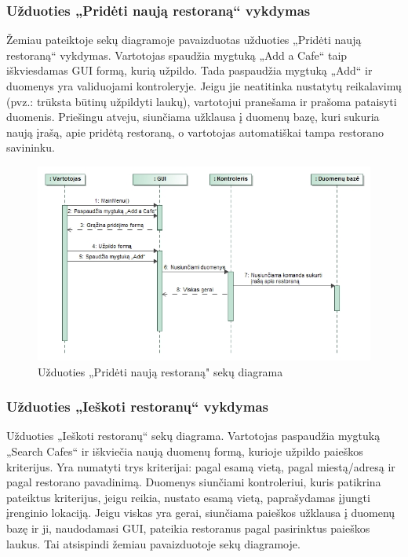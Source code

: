 \documentclass{VUMIFPSkursinis}
\begin{document}
{{{{{%
\subsubsection{Užduoties „Pridėti naują restoraną“ vykdymas}
Žemiau pateiktoje sekų diagramoje pavaizduotas užduoties „Pridėti naują restoraną“ vykdymas. Vartotojas spaudžia mygtuką „Add a Cafe“ taip iškviesdamas GUI formą, kurią užpildo. Tada paspaudžia mygtuką „Add“ ir duomenys yra validuojami kontroleryje. Jeigu jie neatitinka nustatytų reikalavimų (pvz.: trūksta būtinų užpildyti laukų), vartotojui pranešama ir prašoma pataisyti duomenis. Priešingu atveju, siunčiama užklausa į duomenų bazę, kuri sukuria  naują įrašą, apie pridėtą restoraną, o vartotojas automatiškai tampa restorano savininku.

\begin{figure}[H]
	\centering
	\includegraphics[width=\textwidth,height=\textheight,keepaspectratio]{img/AddRestaurant}
	\caption{Užduoties „Pridėti naują restoraną" sekų diagrama}
	\label{img:AddRestaurant}
\end{figure}

\subsubsection{Užduoties „Ieškoti restoranų“ vykdymas}
Užduoties „Ieškoti restoranų“ sekų diagrama. Vartotojas paspaudžia mygtuką „Search Cafes“ ir iškviečia naują duomenų formą, kurioje užpildo paieškos kriterijus. Yra numatyti trys kriterijai: pagal esamą vietą, pagal miestą/adresą ir pagal restorano pavadinimą. Duomenys siunčiami kontroleriui, kuris patikrina pateiktus kriterijus, jeigu reikia, nustato esamą vietą, paprašydamas įjungti įrenginio lokaciją. Jeigu viskas yra gerai, siunčiama paieškos užklausa į duomenų bazę ir ji, naudodamasi GUI, pateikia restoranus pagal pasirinktus paieškos laukus. Tai atsispindi žemiau pavaizduotoje sekų diagramoje.

}}}}}
\end{document}
